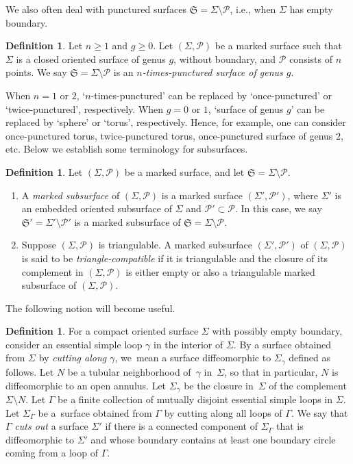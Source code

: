 \documentclass[10pt,a4paper]{amsart}
\numberwithin{equation}{section}
\theoremstyle{definition}
\newtheorem{Definition}[Theorem]{Definition}
\begin{document}
We also often deal with punctured surfaces $\mathfrak{S} = \Sigma\setminus\mathcal{P}$, i.e., when $\Sigma$ has empty boundary.
\begin{Definition}
Let $n\ge 1$ and $g\ge 0$. Let $(\Sigma,\mathcal{P})$ be a marked surface such that $\Sigma$ is a closed oriented surface of genus $g$, without boundary, and $\mathcal{P}$ consists of $n$ points. We say $\mathfrak{S} = \Sigma\setminus\mathcal{P}$ is an {\em $n$-times-punctured surface of genus $g$}.
\end{Definition}
When $n=1$ or $2$, `$n$-times-punctured' can be replaced by `once-punctured' or `twice\nobreakdash-punc\-tured', respectively. When $g=0$ or $1$, `surface of genus $g$' can be replaced by `sphere' or `torus', respectively. Hence, for example, one can consider once-punctured torus, twice-punctured torus, once-punctured surface of genus $2$, etc.
Below we establish some terminology for subsurfaces.
\begin{Definition}
\label{def:subsurfaces}
Let $(\Sigma, \mathcal{P})$ be a marked surface, and let $\mathfrak{S} = \Sigma\setminus\mathcal{P}$.
\begin{enumerate}[label={\rm (\arabic*)}]\itemsep=0pt
\item A {\em marked subsurface} of $(\Sigma,\mathcal{P})$ is a marked surface $(\Sigma',\mathcal{P}')$, where $\Sigma'$ is an embedded oriented subsurface of $\Sigma$ and $\mathcal{P}' \subset \mathcal{P}$. In this case, we say $\mathfrak{S}' = \Sigma'\setminus \mathcal{P}'$ is a marked subsurface of $\mathfrak{S} = \Sigma \setminus \mathcal{P}$.
\item Suppose $(\Sigma,\mathcal{P})$ is triangulable. A marked subsurface $(\Sigma',\mathcal{P}')$ of $(\Sigma,\mathcal{P})$ is said to be {\em triangle-compatible} if it is triangulable and the closure of its complement in $(\Sigma,\mathcal{P})$ is either empty or also a triangulable marked subsurface of $(\Sigma,\mathcal{P})$.
\end{enumerate}
\end{Definition}
The following notion will become useful.
\begin{Definition}\label{def:cutting}
For a compact oriented surface $\Sigma$ with possibly empty boundary, consider an essential simple loop $\gamma$ in the interior of $\Sigma$. By a surface obtained from $\Sigma$ by {\em cutting along $\gamma$}, we~mean a surface diffeomorphic to $\Sigma_\gamma$ defined as follows. Let $N$ be a tubular neighborhood of~$\gamma$ in~$\Sigma$, so that in particular, $N$ is diffeomorphic to an open annulus. Let $\Sigma_\gamma$ be the closure in~$\Sigma$ of the complement $\Sigma\setminus N$.
Let $\Gamma$ be a finite collection of mutually disjoint essential simple loops in $\Sigma$. Let $\Sigma_\Gamma$ be a~surface obtained from $\Gamma$ by cutting along all loops of $\Gamma$. We say that $\Gamma$ {\em cuts out} a surface $\Sigma'$ if there is a connected component of $\Sigma_\Gamma$ that is diffeomorphic to $\Sigma'$ and whose boundary contains at least one boundary circle coming from a loop of $\Gamma$.
\end{Definition}
\end{document}
